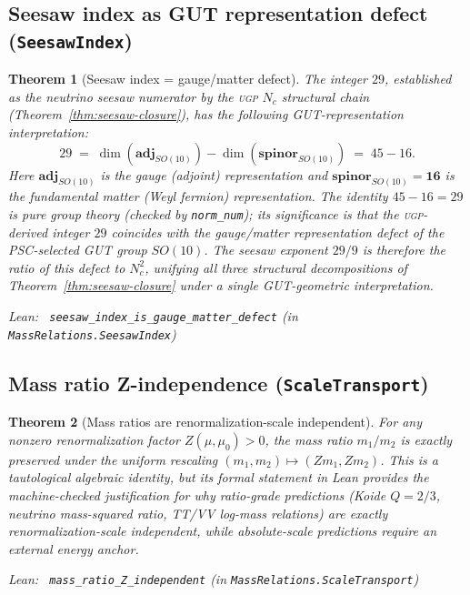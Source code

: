 \documentclass[11pt,a4paper]{article}
\newenvironment{leanref}%
  {\par\smallskip\noindent\begingroup\raggedright\textup{Lean:}~}%
  {\par\endgroup}
\newtheorem{theorem}{Theorem}[section]
\theoremstyle{definition}
\newcommand{\ugp}{\textsc{ugp}}
\begin{document}
\subsection{Seesaw index as GUT representation defect (\texttt{SeesawIndex})}\label{subsec:seesawindex}

\begin{theorem}[Seesaw index = gauge/matter defect]\label{thm:seesaw-index}
The integer $29$, established as the neutrino seesaw numerator by the \ugp{}
$N_c$ structural chain (Theorem~\ref{thm:seesaw-closure}), has the following
GUT-representation interpretation:
\[
  29 \;=\; \dim(\mathbf{adj}_{SO(10)}) - \dim(\mathbf{spinor}_{SO(10)})
     \;=\; 45 - 16.
\]
Here $\mathbf{adj}_{SO(10)}$ is the gauge (adjoint) representation and
$\mathbf{spinor}_{SO(10)} = \mathbf{16}$ is the fundamental matter (Weyl fermion)
representation.  The identity $45 - 16 = 29$ is pure group theory
(checked by \lstinline|norm_num|); its significance is that the \ugp{}-derived
integer $29$ coincides with the gauge/matter representation defect of the
PSC-selected GUT group $SO(10)$.  The seesaw exponent $29/9$ is therefore
the ratio of this defect to $N_c^2$, unifying all three structural decompositions
of Theorem~\ref{thm:seesaw-closure} under a single GUT-geometric interpretation.

\begin{leanref} \lstinline|seesaw_index_is_gauge_matter_defect|
\textup{(in \texttt{MassRelations.SeesawIndex})}
\end{leanref}
\end{theorem}

\subsection{Mass ratio Z-independence (\texttt{ScaleTransport})}\label{subsec:scaletransport}

\begin{theorem}[Mass ratios are renormalization-scale independent]\label{thm:z-indep}
For any nonzero renormalization factor $Z(\mu, \mu_0) > 0$, the mass ratio
$m_1/m_2$ is exactly preserved under the uniform rescaling
$(m_1, m_2) \mapsto (Z m_1, Z m_2)$.  This is a tautological algebraic identity,
but its formal statement in Lean provides the machine-checked justification for
why ratio-grade predictions (Koide $Q = 2/3$, neutrino mass-squared ratio,
TT/VV log-mass relations) are exactly renormalization-scale independent, while
absolute-scale predictions require an external energy anchor.

\begin{leanref} \lstinline|mass_ratio_Z_independent|
\textup{(in \texttt{MassRelations.ScaleTransport})}
\end{leanref}
\end{theorem}
\end{document}
